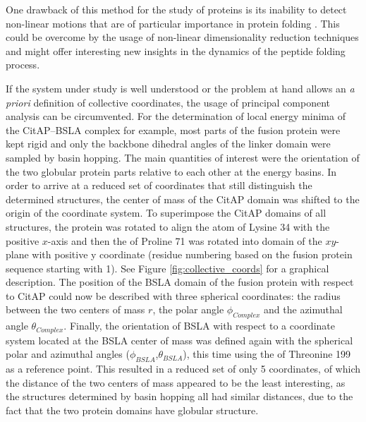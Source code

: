 \documentclass[english, a4paper, 12pt, titlepage, draft]{article}
\begin{document}
One drawback of this method for the study of proteins is its inability to detect non-linear motions that are of particular importance in protein folding \cite{SciMAP}.
This could be overcome by the usage of non-linear dimensionality reduction techniques and might offer interesting new insights in the dynamics of the peptide folding process.



If the system under study is well understood or the problem at hand allows an \emph{a priori} definition of collective coordinates, the usage of principal component analysis can be circumvented.
For the determination of local energy minima of the CitAP--BSLA complex for example, most parts of the fusion protein were kept rigid and only the backbone dihedral angles of the linker domain were sampled by basin hopping.
The main quantities of interest were the orientation of the two globular protein parts relative to each other at the energy basins.
In order to arrive at a reduced set of coordinates that still distinguish the determined structures, the center of mass of the CitAP domain was shifted to the origin of the coordinate system.
To superimpose the CitAP domains of all structures, the protein was rotated to align the  atom of Lysine 34 with the positive $x$-axis and then the  of Proline 71 was rotated into domain of the $xy$-plane with positive y coordinate (residue numbering based on the fusion protein sequence starting with 1).
See Figure \ref{fig:collective_coords} for a graphical description.
The position of the BSLA domain of the fusion protein with respect to CitAP could now be described with three spherical coordinates: the radius between the two centers of mass $r$, the polar angle $\phi_{Complex}$ and the azimuthal angle $\theta_{Complex}$.
Finally, the orientation of BSLA with respect to a coordinate system located at the BSLA center of mass was defined again with the spherical polar and azimuthal angles ($\phi_{BSLA}$,$\theta_{BSLA}$), this time using the  of Threonine 199 as a reference point.
This resulted in a reduced set of only 5 coordinates, of which the distance of the two centers of mass appeared to be the least interesting, as the structures determined by basin hopping all had similar distances, due to the fact that the two protein domains have globular structure.
\end{document}
